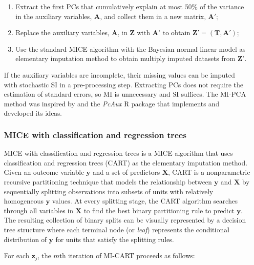 	\begin{enumerate}

	\item Extract the first PCs that cumulatively explain at most 50\% of the variance 
		in the auxiliary variables, $\bm{A}$, and collect them in a new matrix, $\bm{A}'$;
	\item Replace the auxiliary variables, $\bm{A}$, in $\bm{Z}$ with $\bm{A}'$ to obtain 
		$\bm{Z}' = (\bm{T}, \bm{A}')$;
	\item Use the standard MICE algorithm with the Bayesian normal linear model 
		\citep[p. 68, algorithm 3.1]{vanBuuren:2018} as elementary imputation method to obtain multiply 
		imputed datasets from $\bm{Z}'$.
	\end{enumerate}

	If the auxiliary variables are incomplete, their missing values can be imputed with stochastic SI in a pre-processing step.
	Extracting PCs does not require the estimation of standard errors, so MI is unnecessary and SI suffices.
	The MI-PCA method was inspired by \cite{howardEtAl:2015} and the \emph{PcAux} R package \citep{PcAux} that 
	implements and developed its ideas.
	
\subsubsection{MICE with classification and regression trees}
	MICE with classification and regression trees \citep[MI-CART;][]{burgetteReiter:2010} is a MICE algorithm that uses classification and regression trees (CART) as the elementary imputation method.
	Given an outcome variable $\bm{y}$ and a set of predictors $\bm{X}$, CART is a nonparametric recursive partitioning technique 
	that models the relationship between $\bm{y}$ and $\bm{X}$ by sequentially splitting observations into subsets of units with 
	relatively homogeneous $\bm{y}$ values.
	At every splitting stage, the CART algorithm searches through all variables in $\bm{X}$ to find the best binary 
	partitioning rule to predict $\bm{y}$.
	The resulting collection of binary splits can be visually represented by a decision tree structure where each terminal 
	node (or \emph{leaf}) represents the conditional distribution of $\bm{y}$ for units that satisfy the splitting rules.

	
	For each $\bm{z}_j$, the $m$th iteration of MI-CART proceeds as follows:
	
